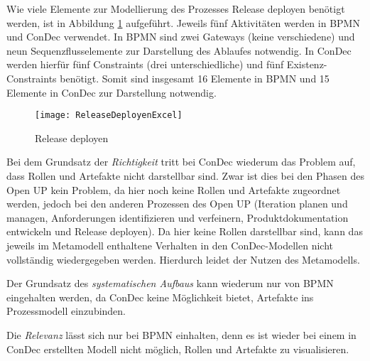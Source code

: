 Wie viele Elemente zur Modellierung des Prozesses Release deployen benötigt werden, ist in Abbildung \ref{fig:ReleaseDeployenExcel} aufgeführt. Jeweils fünf Aktivitäten werden in BPMN und ConDec verwendet. In BPMN sind zwei Gateways (keine verschiedene) und neun Sequenzflusselemente zur Darstellung des Ablaufes notwendig. In ConDec werden hierfür fünf Constraints (drei unterschiedliche)  und fünf Existenz-Constraints benötigt. Somit sind insgesamt 16 Elemente in BPMN und 15 Elemente in ConDec zur Darstellung notwendig. \newline
\begin{figure}[htp]
\begin{center}
  \texttt{[image: ReleaseDeployenExcel]} %
  \caption{Release deployen}
  \label{fig:ReleaseDeployenExcel}
\end{center}
\end{figure}

Bei dem Grundsatz der \textit{Richtigkeit} tritt bei ConDec wiederum das Problem auf, dass Rollen und Artefakte nicht darstellbar sind. Zwar ist dies bei den Phasen des Open UP kein Problem, da hier noch keine Rollen und Artefakte zugeordnet werden, jedoch bei den anderen Prozessen des Open UP (Iteration planen und managen, Anforderungen identifizieren und verfeinern, Produktdokumentation entwickeln und Release deployen). Da hier keine Rollen darstellbar sind, kann das jeweils im Metamodell enthaltene Verhalten in den ConDec-Modellen nicht vollständig wiedergegeben werden. Hierdurch leidet der Nutzen des Metamodells. \newline

Der Grundsatz des \textit{systematischen Aufbaus} kann wiederum nur von BPMN eingehalten werden, da ConDec keine Möglichkeit bietet, Artefakte ins Prozessmodell einzubinden.\newline

Die \textit{Relevanz} lässt sich nur bei BPMN einhalten, denn es ist wieder bei einem in ConDec erstellten Modell nicht möglich, Rollen und Artefakte zu visualisieren.\newline

